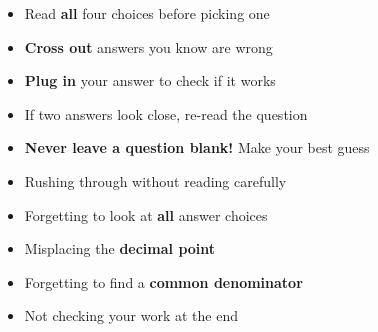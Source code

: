 {%
\begin{minipage}[t]{0.48\textwidth}
\begin{tcolorbox}[
    enhanced,
    colback=funOrangeLight,
    colframe=funOrange!50,
    arc=8pt, boxrule=1pt,
    left=4mm, right=4mm, top=3mm, bottom=3mm,
    title={\textcolor{white}{\faCircle~Multiple Choice Tricks}},
    colbacktitle=funOrange!70,
    fonttitle=\bfseries\sffamily,
    height=5.5cm,
    valign=center,
]
    \small
    \begin{itemize}[leftmargin=*, itemsep=3pt]
        \item Read \textbf{all} four choices before picking one
        \item \textbf{Cross out} answers you know are wrong
        \item \textbf{Plug in} your answer to check if it works
        \item If two answers look close, re-read the question
        \item \textbf{Never leave a question blank!} Make your best guess
    \end{itemize}
\end{tcolorbox}
\end{minipage}%
\hfill
\begin{minipage}[t]{0.48\textwidth}
\begin{tcolorbox}[
    enhanced,
    colback=funRedLight,
    colframe=funRed!50,
    arc=8pt, boxrule=1pt,
    left=4mm, right=4mm, top=3mm, bottom=3mm,
    title={\textcolor{white}{\faExclamationTriangle~Watch Out For...}},
    colbacktitle=funRed!70,
    fonttitle=\bfseries\sffamily,
    height=5.5cm,
    valign=center,
]
    \small
    \begin{itemize}[leftmargin=*, itemsep=3pt]
        \item Rushing through without reading carefully
        \item Forgetting to look at \textbf{all} answer choices
        \item Misplacing the \textbf{decimal point}
        \item Forgetting to find a \textbf{common denominator}
        \item Not checking your work at the end
    \end{itemize}
\end{tcolorbox}
\end{minipage}

\vspace{3mm}

}
